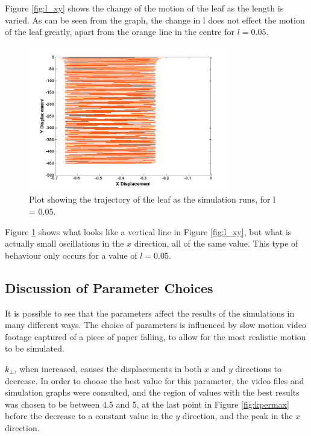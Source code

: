 \noindent Figure \ref{fig:l_xy} shows the change of the motion of the leaf as the length is varied. As can be seen from the graph, the change in l does not effect the motion of the leaf greatly, apart from the orange line in the centre for $l = 0.05$.

\begin{figure}[H]
	\centering
	\includegraphics[width=0.7\linewidth, height=2.5in]{Lorange.png}
	\caption{Plot showing the trajectory of the leaf as the simulation runs, for l = 0.05. }\label{fig:lorange}
\end{figure}

\noindent Figure \ref{fig:lorange} shows what looks like a vertical line in Figure \ref{fig:l_xy}, but what is actually small oscillations in the $x$ direction, all of the same value. This type of behaviour only occurs for a value of $l = 0.05$. 

\subsection{Discussion of Parameter Choices}

It is possible to see that the parameters affect the results of the simulations in many different ways. The choice of parameters is influenced by slow motion video footage captured of a piece of paper falling, to allow for the most realistic motion to be simulated.\newline

\noindent $k_{\perp}$, when increased, causes the displacements in both $x$ and $y$ directions to decrease. In order to choose the best value for this parameter, the video files and simulation graphs were consulted, and the region of values with the best results was chosen to be between 4.5 and 5, at the last point in Figure \ref{fig:kpermax} before the decrease to a constant value in the $y$ direction, and the peak in the $x$ direction.\newline 

